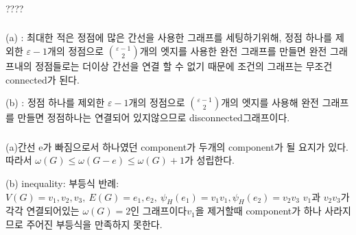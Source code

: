 \subsubsection{} 
????
\subsubsection{} 
(a) : 최대한 적은 정점에 많은 간선을 사용한 그래프를 세팅하기위해,  정점 하나를 제외한 $\varepsilon-1$개의 정점으로 ${\varepsilon-1 \choose 2}$개의 엣지를 사용한 완전 그래프를 만들면 완전 그래프내의 정점들로는 더이상 간선을 연결 할 수 없기 때문에 조건의 그래프는 무조건 connected가 된다.

(b) : 정점 하나를 제외한 $\varepsilon-1$개의 정점으로 ${\varepsilon-1 \choose 2}$개의 엣지를 사용해 완전 그래프를 만들면 정점하나는 연결되어 있지않으므로 disconnected그래프이다.
\subsubsection{} 
%
\subsubsection{} 
%
\subsubsection{} 

(a)간선 e가 빠짐으로서 하나였던 component가 두개의 component가 될 요지가 있다. 따라서 $\omega(G) \le \omega(G-e) \le \omega(G)+1 $가 성립한다.

(b) inequality: 부등식
반례: $V(G) = { v_1, v_2, v_3} ,\: E(G) = { e_1 , e_2} ,\: \psi_H(e_1) = v_1v_1 ,\psi_H(e_2) = v_2v_3  $
$v_1$과 $v_2v_3$가 각각 연결되어있는 $\omega(G) = 2$인 그래프이다$v_1$을 제거할때 component가 하나 사라지므로 주어진 부등식을 만족하지 못한다.
\subsubsection{} 
\subsubsection{} 
\subsubsection{} 
\subsubsection{} 
